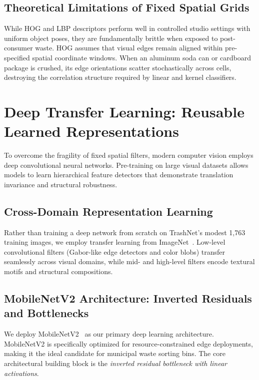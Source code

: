 \documentclass[11pt,a4paper]{article}
\begin{document}
\subsection{Theoretical Limitations of Fixed Spatial Grids}
While HOG and LBP descriptors perform well in controlled studio settings with uniform object poses, they are fundamentally brittle when exposed to post-consumer waste. HOG assumes that visual edges remain aligned within pre-specified spatial coordinate windows. When an aluminum soda can or cardboard package is crushed, its edge orientations scatter stochastically across cells, destroying the correlation structure required by linear and kernel classifiers.

\section{Deep Transfer Learning: Reusable Learned Representations}
To overcome the fragility of fixed spatial filters, modern computer vision employs deep convolutional neural networks. Pre-training on large visual datasets allows models to learn hierarchical feature detectors that demonstrate translation invariance and structural robustness.

\subsection{Cross-Domain Representation Learning}
Rather than training a deep network from scratch on TrashNet's modest 1,763 training images, we employ transfer learning from ImageNet~\cite{deng2009imagenet}. Low-level convolutional filters (Gabor-like edge detectors and color blobs) transfer seamlessly across visual domains, while mid- and high-level filters encode textural motifs and structural compositions.

\subsection{MobileNetV2 Architecture: Inverted Residuals and Bottlenecks}
We deploy MobileNetV2~\cite{sandler2018mobilenetv2} as our primary deep learning architecture. MobileNetV2 is specifically optimized for resource-constrained edge deployments, making it the ideal candidate for municipal waste sorting bins. The core architectural building block is the \textit{inverted residual bottleneck with linear activations}.
\end{document}
